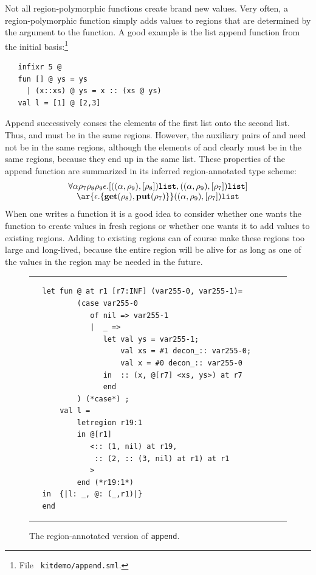 \documentclass[12pt]{book}
\begin{document}
Not all region-polymorphic functions create brand new values. Very
often, a region-polymorphic function simply adds values to regions
that are determined by the argument to the function. A good example is
the list append function from the initial basis:\footnote{File {\tt
    kitdemo/append.sml}.}
\begin{verbatim}
   infixr 5 @
   fun [] @ ys = ys
     | (x::xs) @ ys = x :: (xs @ ys)
   val l = [1] @ [2,3]
\end{verbatim}
Append successively conses the elements of the first list onto the
second list.  Thus,  and  must be in the same
regions. However, the auxiliary pairs of  and 
need not be in the same regions, although the elements of 
and  clearly must be in the same regions, because they end
up in the same list. These properties of the append function 
are summarized in its inferred region-annotated type scheme:
$$\begin{array}{c}\forall\alpha\rho_7\rho_8\rho_9\epsilon.
   [ ((\alpha,\rho_9),[\rho_8])\boxml{list},
      ((\alpha,\rho_9),[\rho_7])\boxml{list} ] \\
\ar{\epsilon.\{\Get(\rho_8),\Put(\rho_7)\}} ((\alpha,\rho_9),[\rho_7])\boxml{list}\end{array}
$$
When one writes a function it is a good idea to consider whether one
wants the function to create values in fresh regions or whether one
wants it to add values to existing regions.  Adding to existing
regions can of course make these regions too large and long-lived,
because the entire region will be alive for as long as one of the
values in the region may be needed in the future. 

\begin{figure}[htb]
\hrule
\medskip
\begin{verbatim}
   let fun @ at r1 [r7:INF] (var255-0, var255-1)= 
           (case var255-0 
              of nil => var255-1
              |  _ => 
                 let val ys = var255-1; 
                     val xs = #1 decon_:: var255-0; 
                     val x = #0 decon_:: var255-0
                 in  :: (x, @[r7] <xs, ys>) at r7
                 end 
           ) (*case*) ; 
       val l = 
           letregion r19:1 
           in @[r1] 
              <:: (1, nil) at r19, 
               :: (2, :: (3, nil) at r1) at r1
              > 
           end (*r19:1*)
   in  {|l: _, @: (_,r1)|}
   end 
\end{verbatim}
\caption{The region-annotated version of {\tt append}.}  
\medskip
\hrule
\label{append.fig}
\end{figure}
\end{document}
